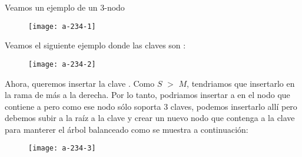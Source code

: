 \documentclass[10pt,a4paper]{article}
\begin{document}
Veamos un ejemplo de un 3-nodo
\newline
\newline
\begin{figure}[h]
	\centering
\texttt{[image: a-234-1]}
	\label{drivers1}
\end{figure}      
\newline
\newline
Veamos el siguiente ejemplo donde las claves son :
\newline
\newline
\begin{figure}[h]
	\centering
\texttt{[image: a-234-2]}
	\label{drivers1}
\end{figure}      
\newline
\newline
Ahora, queremos insertar la clave .
\newline
\newline
Como $S$ $>$ $M$, tendriamos que insertarlo en la rama de más a la derecha. Por lo tanto, podriamos insertar a  en el nodo que contiene a  pero como ese nodo sólo soporta 3 claves, podemos insertarlo allí pero debemos subir a la raíz a la clave  y crear un nuevo nodo que contenga a la clave para manterer el árbol balanceado como se muestra a continuación:
\newline
\newline
\begin{figure}[h]
	\centering
\texttt{[image: a-234-3]}
	\label{drivers1}
\end{figure}      
\newpage
\end{document}
